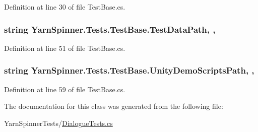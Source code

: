 Definition at line 30 of file Test\-Base.\-cs.

\hypertarget{a00172_aa9b4d902d61adad7165154a265f69aa4}{
\subsubsection[{Test\-Data\-Path}]{\setlength{\rightskip}{0pt plus 5cm}string Yarn\-Spinner.\-Tests.\-Test\-Base.\-Test\-Data\-Path\hspace{0.3cm}{\ttfamily [static]}, {\ttfamily [get]}, {\ttfamily [inherited]}}}\label{a00172_aa9b4d902d61adad7165154a265f69aa4}


Definition at line 51 of file Test\-Base.\-cs.

\hypertarget{a00172_a39922286f6255e4fd0e433a4fc7521c4}{
\subsubsection[{Unity\-Demo\-Scripts\-Path}]{\setlength{\rightskip}{0pt plus 5cm}string Yarn\-Spinner.\-Tests.\-Test\-Base.\-Unity\-Demo\-Scripts\-Path\hspace{0.3cm}{\ttfamily [static]}, {\ttfamily [get]}, {\ttfamily [inherited]}}}\label{a00172_a39922286f6255e4fd0e433a4fc7521c4}


Definition at line 59 of file Test\-Base.\-cs.



The documentation for this class was generated from the following file\-:\begin{DoxyCompactItemize}
\item 
Yarn\-Spinner\-Tests/\hyperlink{a00331}{Dialogue\-Tests.\-cs}\end{DoxyCompactItemize}
